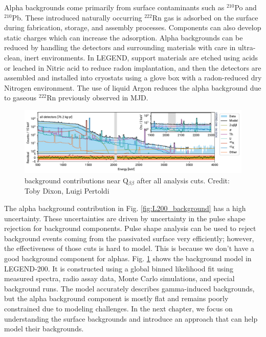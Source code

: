 Alpha backgrounds come primarily from surface contaminants such as $^{210}$Po and $^{210}$Pb. These introduced naturally occurring $^{222}$Rn gas is adsorbed on the surface during fabrication, storage, and assembly processes. Components can also develop static charges which can increase the adsorption. Alpha backgrounds can be reduced by handling the detectors and surrounding materials with care in ultra-clean, inert environments. In LEGEND, support materials are etched using acids or leached in Nitric acid to reduce radon implantation, and then the detectors are assembled and installed into cryostats using a glove box with a radon-reduced dry Nitrogen environment. The use of liquid Argon reduces the alpha background due to gaseous $^{222}$Rn previously observed in MJD.



\begin{figure}
\centering
  \includegraphics[width=0.99\linewidth]{ch2/figs/l200-bkgmodel-2_compressed.pdf}
  \caption{{\Ltwo} background contributions near Q$_{\beta\beta}$ after all analysis cuts. Credit: Toby Dixon, Luigi Pertoldi}
\label{ch2:fig:L200_background_model_fit}
  \end{figure}

  

 The alpha background contribution in Fig. \ref{fig:L200_background} has a  high uncertainty. These uncertainties are driven by uncertainty in the pulse shape rejection for background components. Pulse shape analysis can be used to reject background events coming from the passivated surface very efficiently; however, the effectiveness of those cuts is hard to model. This is because we don't have a good background component for alphas. Fig. \ref{ch2:fig:L200_background_model_fit} shows the background model in LEGEND-200. It is constructed using a global binned likelihood fit using measured spectra, radio assay data, Monte Carlo simulations, and special background runs. The model accurately describes gamma-induced backgrounds, but the alpha background component is mostly flat and remains poorly constrained due to modeling challenges. In the next chapter, we focus on understanding the surface backgrounds and introduce an approach that can help model their backgrounds.

